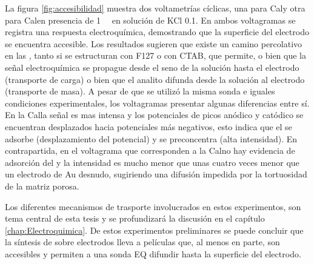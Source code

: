 			La figura \ref{fig:accesibilidad} muestra dos voltametrías cíclicas, una para Cal\pdmF\space y otra para Cal\pdmC\space en presencia de \aminorutenio\space \SI{1}{\milli\Molar} en solución de KCl \SI{0.1}{\Molar}. En ambos voltagramas se registra una respuesta electroquímica, demostrando que la superficie del electrodo se encuentra accesible. Los resultados sugieren que existe un camino percolativo en las \pdm, tanto si se estructuran con F127 o con CTAB, que permite, o bien que la señal electroquímica se propague desde el seno de la solución hasta el electrodo (transporte de carga) o bien que el analito difunda desde la solución al electrodo (transporte de masa). A pesar de que se utilizó la misma sonda e iguales condiciones experimentales, los voltagramas presentar algunas diferencias entre sí. En la Cal\pdmF\space la señal es mas intensa y los potenciales de picos anódico y catódico se encuentran desplazados hacia potenciales más negativos, esto indica que el \ru\space se adsorbe (desplazamiento del potencial) y se preconcentra (alta intensidad). En contrapartida, en el voltagrama que corresponden a la Cal\pdmC\space no hay evidencia de adsorción del \ru\space y la intensidad es mucho menor que unas cuatro veces menor que un electrodo de Au desnudo, sugiriendo una difusión impedida por la tortuosidad de la matriz porosa.


			Los diferentes mecanismos de trasporte involucrados en estos experimentos, son tema central de esta tesis y se profundizará la discusión en el capítulo \ref{chap:Electroquimica}. De estos experimentos preliminares se puede concluir que la síntesis de \pdm\space sobre electrodos lleva a películas que, al menos en parte, son accesibles y permiten a una sonda EQ difundir hasta la superficie del electrodo.   

